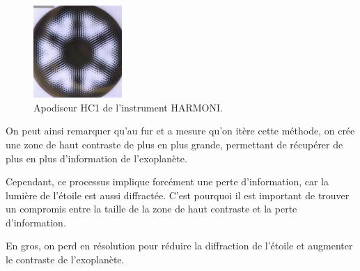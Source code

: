 \begin{figure}
    \centering
    \includegraphics[width=0.30\textwidth]{figures/apod_harmoni.png}
    \caption{Apodiseur HC1 de l'instrument HARMONI.}%
\end{figure}

On peut ainsi remarquer qu'au fur et a mesure qu'on itère cette méthode, on crée une zone de haut contraste de plus en plus grande, permettant de récupérer de plus en plus d'information de l'exoplanète.



Cependant, ce processus implique forcément une perte d'information, car la lumière de l'étoile est aussi diffractée. C'est pourquoi il est important de trouver un compromis entre la taille de la zone de haut contraste et la perte d'information.

En gros, on perd en résolution pour réduire la diffraction de l'étoile et augmenter le contraste de l'exoplanète.


